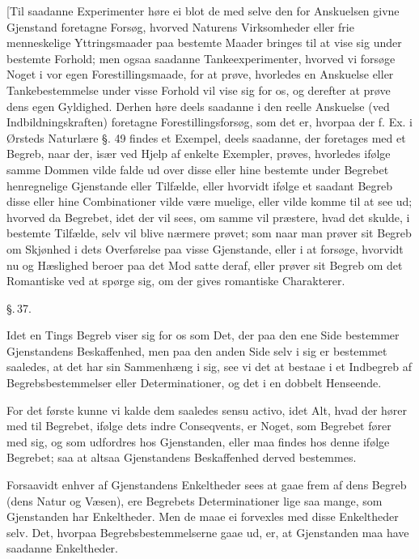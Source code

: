 \documentclass[12pt]{book}
\def\textit#1{#1}%
\def\emph#1{#1}%
\newcommand{\parag}[1]{%
  \par\vspace{0.9\baselineskip}%
  {\centering\textit{\S.\,#1.}\par}%
  \vspace{0.35\baselineskip}%
  \noindent\hspace{\parindent}\ignorespaces
}
\newcommand{\opage}[1]{\marginnote{\footnotesize\textit{[#1]}}}
\begin{document}
[Til saadanne Experimenter høre ei blot de med selve den for Anskuelsen givne
Gjenstand foretagne Forsøg, hvorved Naturens Virksomheder eller frie menneskelige
Yttringsmaader paa bestemte Maader bringes til at vise sig under bestemte
Forhold; men ogsaa saadanne Tankeexperimenter, hvorved vi forsøge Noget i vor
egen Forestillingsmaade, for at prøve, hvorledes en Anskuelse eller
Tankebestemmelse under visse Forhold vil vise sig for os, og derefter at prøve
dens egen Gyldighed. Derhen høre deels saadanne i den reelle Anskuelse (ved
Indbildningskraften) foretagne Forestillingsforsøg, som det er, hvorpaa der f.
Ex. i Ørsteds Naturlære §. 49 findes et Exempel, deels saadanne, der foretages
med et Begreb, naar der, især ved Hjelp af enkelte Exempler, prøves, hvorledes
ifølge samme Dommen vilde falde ud over disse eller hine bestemte under Begrebet
henregnelige Gjenstande eller Tilfælde, eller hvorvidt ifølge et saadant Begreb
disse eller hine Combinationer vilde være muelige, eller vilde komme til at see
ud; hvorved da Begrebet, idet der vil sees, om samme vil præstere, hvad det
skulde, i bestemte Tilfælde, selv vil blive nærmere prøvet; som naar man prøver
sit Begreb om Skjønhed i dets Overførelse paa visse Gjenstande, eller i at
forsøge, hvorvidt nu og Hæslighed beroer paa det Mod%
\opage{97}satte deraf, eller prøver sit Begreb om det Romantiske ved at spørge sig, om der
gives romantiske Charakterer.

\parag{37}

Idet en Tings Begreb viser sig for os som Det, der paa den ene Side bestemmer
Gjenstandens Beskaffenhed, men paa den anden Side selv i sig er bestemmet
saaledes, at det har sin Sammenhæng i sig, see vi det at bestaae i et Indbegreb
af Begrebsbestemmelser eller Determinationer, og det i en dobbelt Henseende.

For det første kunne vi kalde dem saaledes \textit{sensu activo}, idet Alt, hvad
der hører med til Begrebet, ifølge dets indre Conseqvents, er Noget, som Begrebet
fører med sig, og som udfordres hos Gjenstanden, eller maa findes hos denne
ifølge Begrebet; saa at altsaa Gjenstandens Beskaffenhed derved bestemmes.

Forsaavidt enhver af Gjenstandens Enkeltheder sees at gaae frem af dens Begreb
(dens Natur og Væsen), ere Begrebets Determinationer lige saa mange, som
Gjenstanden har Enkeltheder. Men de maae ei forvexles med disse
\emph{Enkeltheder} selv. Det, hvorpaa Begrebsbestemmelserne gaae ud, er, at
Gjenstanden maa have saadanne Enkeltheder.
\end{document}
